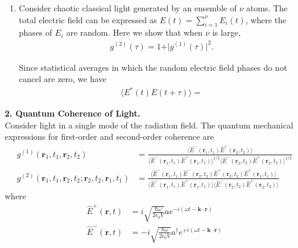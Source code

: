 \documentclass{article}
\theoremstyle{definition}
\newcommand{\f}[2]{\frac{#1}{#2}}
\begin{document}
\begin{enumerate}[label=\alph*)]
\item Consider chaotic classical light generated by an ensemble of $\nu$ atoms. The total electric field can be expressed as $E(t) = \sum^\nu_{i=1} E_i(t)$, where the phases of $E_i$ are random. Here we show that when $\nu$ is large, 
\begin{align*}
g^{(2)}(\tau) = 1 + \vert g^{(1)} (\tau)\vert ^2.
\end{align*}

Since statistical averages in which the random electric field phases do not cancel are zero, we have 
\begin{align*}
\langle E^*(t) E(t+\tau) \rangle = 
\end{align*}



\end{enumerate}





\noindent \textbf{2. Quantum Coherence of Light.}\\

\noindent Consider light in a single mode of the radiation field. The quantum mechanical expressions for
first-order and second-order coherence are
\begin{align*}
g^{(1)}(\mathbf{r}_1, t_1, \mathbf{r}_2, t_2) 
&= \f{\langle \hat{E}^-(\mathbf{r}_1, t_1)  \hat{E}^+(\mathbf{r}_2, t_2) \rangle }{ 
\langle \hat{E}^-(\mathbf{r}_1, t_1) \hat{E}^+(\mathbf{r}_1, t_1) \rangle^{1/2}   
\langle \hat{E}^-(\mathbf{r}_2, t_2) \hat{E}^+(\mathbf{r}_2, t_2)\rangle^{1/2}} \\
g^{(2)}(\mathbf{r}_1, t_1, \mathbf{r}_2, t_2 ; \mathbf{r}_2, t_2, \mathbf{r}_1, t_1) 
&= \f{\langle \hat{E}^-(\mathbf{r}_1, t_1) \hat{E}^-(\mathbf{r}_2, t_2) \hat{E}^+(\mathbf{r}_2, t_2) \hat{E}^+(\mathbf{r}_1, t_1)  \rangle }{
\langle \hat{E}^-(\mathbf{r}_1, t_1) \hat{E}^+(\mathbf{r}_1, t_1) \rangle 
\langle \hat{E}^-(\mathbf{r}_2, t_2) \hat{E}^+(\mathbf{r}_2, t_2)\rangle}
\end{align*}
where
\begin{align*}
\hat{E}^+(\mathbf{r},t) &= 
i \sqrt{ \f{\hbar \omega}{2 \epsilon_0 V} } a e^{-i(\omega t - \mathbf{k} \cdot \mathbf{r})} \\
\hat{E}^-(\mathbf{r},t) &= 
- i \sqrt{ \f{\hbar \omega}{2 \epsilon_0 V} } a^\dagger e^{+i(\omega t - \mathbf{k} \cdot \mathbf{r})} 
\end{align*}
\end{document}
